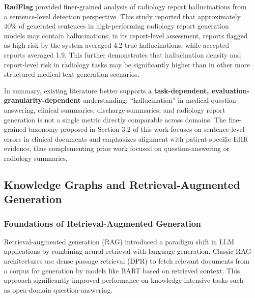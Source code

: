 \documentclass[11pt]{article}
\begin{document}
\textbf{RadFlag} \citep{zhang2024radFlag} provided finer-grained analysis of radiology report hallucinations from a sentence-level detection perspective. This study reported that approximately 40\% of generated sentences in high-performing radiology report generation models may contain hallucinations; in its report-level assessment, reports flagged as high-risk by the system averaged 4.2 true hallucinations, while accepted reports averaged 1.9. This further demonstrates that hallucination density and report-level risk in radiology tasks may be significantly higher than in other more structured medical text generation scenarios.

In summary, existing literature better supports a \textbf{task-dependent, evaluation-granularity-dependent} understanding: ``hallucination'' in medical question-answering, clinical summaries, discharge summaries, and radiology report generation is not a single metric directly comparable across domains. The fine-grained taxonomy proposed in Section 3.2 of this work focuses on sentence-level errors in clinical documents and emphasizes alignment with patient-specific EHR evidence, thus complementing prior work focused on question-answering or radiology summaries.

\subsection{Knowledge Graphs and Retrieval-Augmented Generation}

\subsubsection{Foundations of Retrieval-Augmented Generation}

Retrieval-augmented generation (RAG) \citep{lewis2020retrievalAugmentedGeneration} introduced a paradigm shift in LLM applications by combining neural retrieval with language generation. Classic RAG architectures use dense passage retrieval (DPR) to fetch relevant documents from a corpus for generation by models like BART based on retrieved context. This approach significantly improved performance on knowledge-intensive tasks such as open-domain question-answering.
\end{document}
